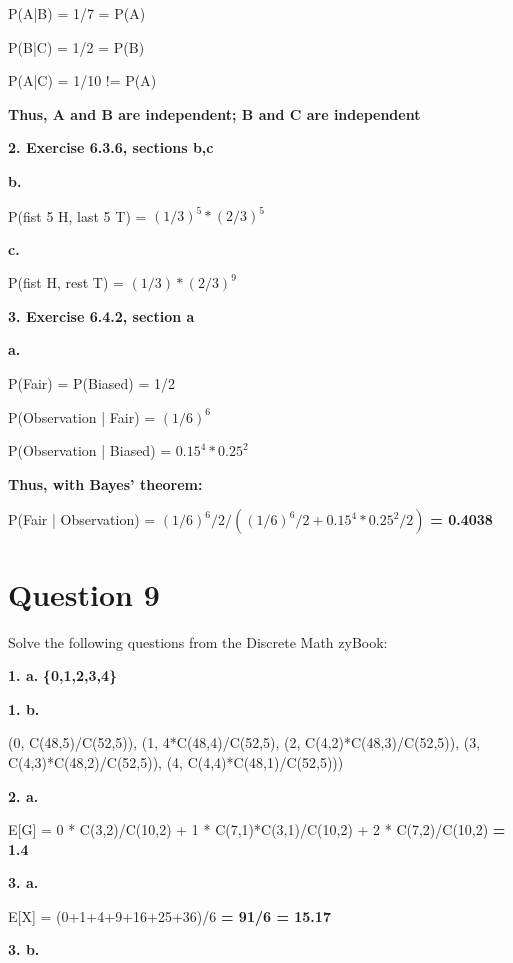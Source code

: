 \documentclass[11pt]{article}
\begin{document}
	P(A|B) = 1/7 = P(A)
	
	P(B|C) = 1/2 = P(B)
	
	P(A|C) = 1/10 != P(A)
	
	\textbf{Thus, A and B are independent; B and C are independent}
	

	\vspace{10mm}
	\textbf{2. Exercise 6.3.6, sections b,c}
	
	\textbf{b.}
	
	P(fist 5 H, last 5 T) = $(1/3)^5*(2/3)^5$
	
	\vspace{5mm}
	\textbf{c.}
	
	P(fist H, rest T) = $(1/3)*(2/3)^9$
	
	\vspace{10mm}
	\textbf{3. Exercise 6.4.2, section a}
	
	\textbf{a.}
	
	P(Fair) = P(Biased) = 1/2
	
	P(Observation | Fair) = $(1/6)^6$
	
	P(Observation | Biased) = $0.15^4*0.25^2$
	
	\textbf{Thus, with Bayes' theorem:}
	
	P(Fair | Observation) = $(1/6)^6/2/((1/6)^6/2+0.15^4*0.25^2/2)$ \textbf{= 0.4038}

	\newpage
	\section*{Question 9}
	Solve the following questions from the Discrete Math zyBook:
	
	\textbf{1. a.}
	\textbf{\{0,1,2,3,4\}}
	
	\vspace{10mm}
	\textbf{1. b.}
	
	(0, C(48,5)/C(52,5)), (1, 4*C(48,4)/C(52,5), (2, C(4,2)*C(48,3)/C(52,5)), (3, C(4,3)*C(48,2)/C(52,5)), (4, C(4,4)*C(48,1)/C(52,5)))
	
	\vspace{10mm}
	\textbf{2. a.}
	
	E[G] = 0 * C(3,2)/C(10,2) + 1 * C(7,1)*C(3,1)/C(10,2) + 2 * C(7,2)/C(10,2) \textbf{= 1.4}
	
	\vspace{10mm}
	\textbf{3. a.}
	
	E[X] = (0+1+4+9+16+25+36)/6 \textbf{= 91/6 = 15.17}
	
	\vspace{10mm}
	\textbf{3. b.}
	
\end{document}
